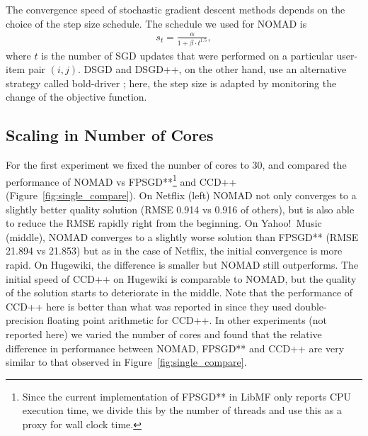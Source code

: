 \documentclass{vldb}
\begin{document}
The convergence speed of stochastic gradient descent methods depends on
the choice of the step size schedule.  The schedule we used for NOMAD
is
\begin{align}
  \label{eq:stepsize_method}
  s_t = \frac{\alpha}{1 + \beta \cdot t^{1.5}},
\end{align}
where $t$ is the number of SGD updates that were performed on a
particular user-item pair $(i,j)$.  DSGD and DSGD++, on the other
hand, use an alternative strategy called bold-driver
\citep{GemNijHaaSis11}; here, the step size is adapted by monitoring
the change of the objective function. 




\subsection{Scaling in Number of Cores}
\label{sec:ScalingNumberCores}

For the first experiment we fixed the number of cores to 30, and
compared the performance of NOMAD vs FPSGD**\footnote{Since the current
  implementation of FPSGD** in LibMF only reports CPU execution time, we
  divide this by the number of threads and use this as a proxy for wall
  clock time.} and CCD++ (Figure~\ref{fig:single_compare}).  On Netflix
(left) NOMAD not only converges to a slightly better quality solution
(RMSE 0.914 vs 0.916 of others), but is also able to reduce the RMSE
rapidly right from the beginning.  On Yahoo!\ Music (middle), NOMAD
converges to a slightly worse solution than FPSGD** (RMSE 21.894 vs
21.853) but as in the case of Netflix, the initial convergence is more
rapid.  On Hugewiki, the difference is smaller but NOMAD still
outperforms.  The initial speed of CCD++ on Hugewiki is comparable to
NOMAD, but the quality of the solution starts to deteriorate in the
middle.  Note that the performance of CCD++ here is better than what was
reported in \citet{ZhuChiJuaLin13} since they used double-precision
floating point arithmetic for CCD++.  In other experiments (not reported
here) we varied the number of cores and found that the relative
difference in performance between NOMAD, FPSGD** and CCD++ are very
similar to that observed in Figure~\ref{fig:single_compare}.
\end{document}
